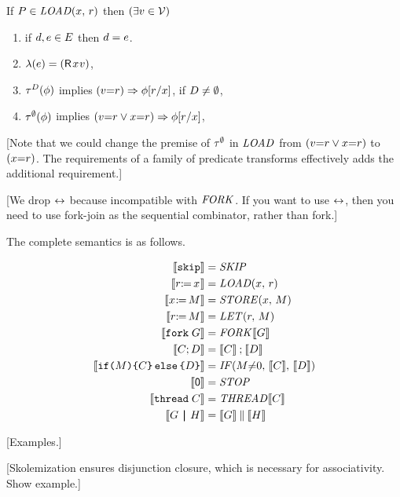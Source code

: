 \begin{definition}
  \noindent
  If $\aPS\SB0 \in \sLOAD{\aLoc}{\aReg}$ then
  $(\exists\aVal\in\Val)$
  \begin{enumerate}
  \item if $\bEv,\aEv\in\aEvs\SB0$ then $\bEv=\aEv$.
  \item $\labelingAct\SB0(\aEv) = \DRP{\aLoc}{\aVal}$,
  \item %
    $\aTr[\bEvs]\SB0(\aForm)$ implies $(\aVal{=}\aReg)\limplies\aForm[\aReg/\aLoc]$, if $\bEvs\neq\emptyset$,
  \item %
    $\aTr[\emptyset]\SB0(\aForm)$ implies $(\aVal{=}\aReg\lor\aLoc{=}\aReg)\limplies\aForm[\aReg/\aLoc]$,
  \end{enumerate}
\end{definition}
[Note that we could change the premise of $\aTr[\emptyset]$ in $\sLOAD{}{}$
from $(\aVal{=}\aReg\lor\aLoc{=}\aReg)$ to $(\aLoc{=}\aReg)$. The
requirements of a family of predicate transforms effectively adds the
additional requirement.]

[We drop $\reorder$ because incompatible with $\sFORK{}$.  If you want to use
$\reorder$, then you need to use fork-join as the sequential combinator,
rather than fork.]



The complete semantics is as follows.
\begin{scope}
  \allowdisplaybreaks
\begin{align*}
  \sem{\SKIP} &= \sSKIP
  \\
  \sem{\PR{\aLoc}{\aReg}} &= \sLOAD{\aLoc}{\aReg}
  \\
  \sem{\PW{\aLoc}{\aExp}} &= \sSTORE{\aLoc}{\aExp}
  \\
  \sem{\LET{\aReg}{\aExp}} &= \sLET{\aReg}{\aExp}
  \\
  \sem{\FORK{\aGrp}} &= \sFORK{}\sem{\aGrp}
  \\
  \sem{\aCmd \SEMI \bCmd} &= \sem{\aCmd}\sSEMI\sem{\bCmd}
  \\
  \sem{\IF{\aExp}\THEN\aCmd\ELSE\bCmd\FI} &= \sIF{\aExp{\neq}0}\sTHEN\sem{\aCmd}\sELSE\sem{\bCmd}\sFI
  \\
  \sem{\NIL} &= \sSTOP
  \\
  \sem{\THREAD{\aCmd}} &= \sTHREAD{}\sem{\aCmd}
  \\
  \sem{\aGrp \PAR \bGrp} &= \sem{\aGrp}\sPAR\sem{\bGrp}
\end{align*}
\end{scope}
[Examples.]



[Skolemization ensures disjunction closure, which is necessary
for associativity. Show example.]


